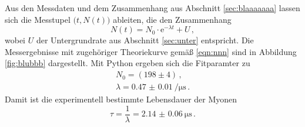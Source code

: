 Aus den Messdaten und dem Zusammenhang aus Abschnitt \ref{sec:blaaaaaaa} lassen sich die
Messtupel $\big(t, N(t)\big)$ ableiten, die den Zusammenhang
\begin{equation}
	\label{eqn:nnn}
	N(t) = N_0 \cdot \mathrm{e}^{-\lambda t} + U \, \mathrm{,}
\end{equation}
wobei $U$ der Untergrundrate aus Abschnitt \ref{sec:unter} entspricht.
Die Messergebnisse mit zugehöriger Theoriekurve gemäß \eqref{eqn:nnn} sind in Abbildung
\ref{fig:blubbb} dargestellt.
Mit Python \cite{numpy} ergeben sich die Fitparamter zu
\begin{align*}
	N_0 = (198 \pm 4 ) \, \mathrm{,} \\
	\lambda = \SI{0.47(1)}{\per\micro\second} \, \mathrm{.}
\end{align*}
Damit ist die experimentell bestimmte Lebensdauer der Myonen
\begin{equation*}
	\tau = \frac{1}{\lambda} = \SI{2.14(6)}{\micro\second} \, \mathrm{.}
\end{equation*}
